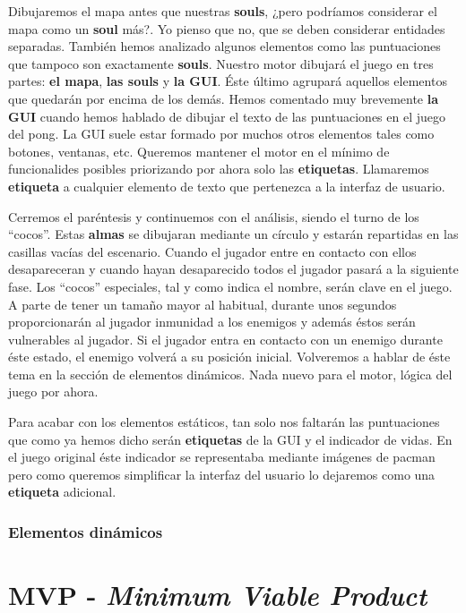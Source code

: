 \documentclass[a4paper]{article}
\begin{document}
Dibujaremos el mapa antes que nuestras \textbf{souls}, ¿pero podríamos considerar el mapa como un \textbf{soul} más?. Yo pienso que no, que se deben considerar entidades separadas. También hemos analizado algunos elementos como las puntuaciones que tampoco son exactamente \textbf{souls}. Nuestro motor dibujará el juego en tres partes: \textbf{el mapa}, \textbf{las souls} y \textbf{la GUI}. Éste último agrupará aquellos elementos que quedarán por encima de los demás. Hemos comentado muy brevemente \textbf{la GUI} cuando hemos hablado de dibujar el texto de las puntuaciones en el juego del pong. La GUI suele estar formado por muchos otros elementos tales como botones, ventanas, etc. Queremos mantener el motor en el mínimo de funcionalides posibles priorizando por ahora solo las \textbf{etiquetas}. Llamaremos \textbf{etiqueta} a cualquier elemento de texto que pertenezca a la interfaz de usuario.

Cerremos el paréntesis y continuemos con el análisis, siendo el turno de los ``cocos''. Estas \textbf{almas} se dibujaran mediante un círculo y estarán repartidas en las casillas vacías del escenario. Cuando el jugador entre en contacto con ellos desapareceran y cuando hayan desaparecido todos el jugador pasará a la siguiente fase. Los ``cocos'' especiales, tal y como indica el nombre, serán clave en el juego. A parte de tener un tamaño mayor al habitual, durante unos segundos proporcionarán al jugador inmunidad a los enemigos y además éstos serán vulnerables al jugador. Si el jugador entra en contacto con un enemigo durante éste estado, el enemigo volverá a su posición inicial. Volveremos a hablar de éste tema en la sección de elementos dinámicos. Nada nuevo para el motor, lógica del juego por ahora.

Para acabar con los elementos estáticos, tan solo nos faltarán las puntuaciones que como ya hemos dicho serán \textbf{etiquetas} de la GUI y el indicador de vidas. En el juego original éste indicador se representaba mediante imágenes de pacman pero como queremos simplificar la interfaz del usuario lo dejaremos como una \textbf{etiqueta} adicional.

\subsubsection{Elementos dinámicos}

\section{MVP - \textit{Minimum Viable Product}}
\end{document}
